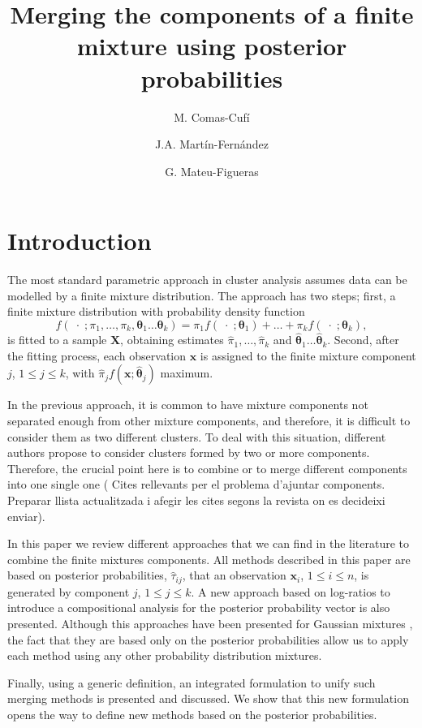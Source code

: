 \documentclass[10pt, a4paper]{article}
\title{Merging the components of a finite mixture using  posterior probabilities}
\author{M. Comas-Cufí \and J.A. Martín-Fernández \and G. Mateu-Figueras}
\newcommand{\m}[1]{\boldsymbol{#1}}
\begin{document}
\maketitle

\section{Introduction}

The most standard parametric approach in cluster analysis assumes data can be modelled by a finite mixture distribution. The approach has two steps; first, a finite mixture distribution with probability density function
\[
f(\;\cdot\; ; \pi_1, \dots, \pi_k, \m\theta_1 \dots \m\theta_k) = \pi_1   f(\;\cdot\; ; \m\theta_1) + \dots + \pi_k f(\;\cdot\; ; \m\theta_k),
\]%
is fitted to a sample $\m X$, obtaining estimates $\hat{\pi}_1, \dots, \hat{\pi}_k$ and $\hat{\m\theta}_1 \dots \hat{\m\theta}_k$. Second, after the fitting process, each observation $\m x$ is assigned to the finite mixture component $j$, $1\leq j \leq k$, with $\hat{\pi}_j f(\m x ; \hat{\m\theta}_j)$ maximum.

In the previous approach, it is common to have mixture components not separated enough from other mixture components, and therefore, it is difficult to consider them as two different clusters. To deal with this situation, different authors propose to consider clusters formed by two or more components. Therefore, the crucial point here is to combine or to merge different components into one single one ({\color{red} Cites rellevants per el problema d'ajuntar components. Preparar llista actualitzada i afegir les cites segons la revista on es decideixi enviar}).

In this paper we review different approaches that we can find in the literature to combine the finite mixtures components. All methods described in this paper are based on posterior probabilities, $\hat{\tau}_{ij}$, that an observation $\m x_i$, $1\leq i \leq n$, is generated by component $j$, $1\leq j\leq k$. A new approach based on log-ratios to introduce a compositional analysis for the posterior probability vector is also presented. Although this approaches have been presented for Gaussian mixtures \citep{longford2014,melnykov2013distribution,hennig2010methods,baudry2010combining}, the fact that they are based only on the posterior probabilities allow us to apply each method using any other probability distribution mixtures.

Finally, using a generic definition, an integrated formulation to unify such merging methods is presented and discussed. We show that this new formulation opens the way to define new methods based on the posterior probabilities.
\end{document}
